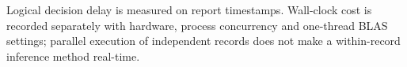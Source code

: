 Logical decision delay is measured on report timestamps. Wall-clock cost is recorded separately with hardware, process concurrency and one-thread BLAS settings; parallel execution of independent records does not make a within-record inference method real-time. 
